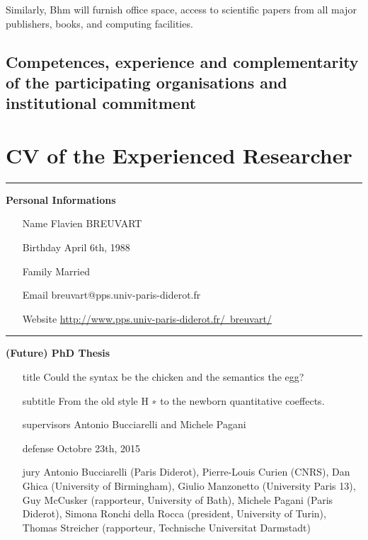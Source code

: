 \documentclass{article}[11pt]
\begin{document}
Similarly, Bhm will furnish office space, access to scientific papers from all major publishers,
books, and computing facilities.


\subsection{Competences, experience and complementarity of the participating organisations and institutional commitment}



\section{CV of the Experienced Researcher}

\newcommand\entry[5]{\item[#1]{\bf #2} #3 {\em #4} #5}

\noindent \rule{5.5em}{7pt} {\large \bf Personal Informations} \nobreak
\begin{itemize}[itemindent=0em,leftmargin=6em, labelsep=1em]
\item[Name] Flavien BREUVART
\item[Birthday] April 6th, 1988
\item[Family] Married 
\item[Email] breuvart@pps.univ-paris-diderot.fr
\item[Website] \href{http://www.pps.univ-paris-diderot.fr/~breuvart/}{http://www.pps.univ-paris-diderot.fr/~breuvart/}
\end{itemize}

\noindent \rule{5.5em}{7pt} {\large \bf (Future) PhD Thesis} \nobreak
\begin{itemize}[itemindent=0em,leftmargin=6em, labelsep=1em]
\item[title]{Could the syntax be the chicken and the semantics the egg?}
\item[subtitle]{From the old style H ∗ to the newborn quantitative coeffects.}
\item[supervisors]{Antonio Bucciarelli and Michele Pagani}
\item[defense]{Octobre 23th, 2015}
\item[jury]{Antonio Bucciarelli (Paris Diderot), Pierre-Louis Curien (CNRS), Dan Ghica (University of Birmingham), Giulio Manzonetto (University Paris 13), Guy McCusker (rapporteur, University of Bath), Michele Pagani (Paris Diderot), Simona Ronchi della Rocca (president, University of Turin), Thomas Streicher (rapporteur, Technische Universitat Darmstadt)}
\end{itemize}
\end{document}
